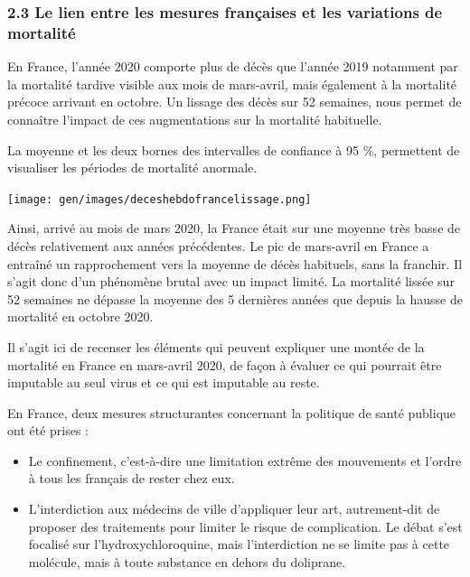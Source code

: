 \documentclass[
]{article}
\begin{document}
\hypertarget{le-lien-entre-les-mesures-franuxe7aises-et-les-variations-de-mortalituxe9}{%
\subsubsection{2.3 Le lien entre les mesures françaises et les
variations de
mortalité}\label{le-lien-entre-les-mesures-franuxe7aises-et-les-variations-de-mortalituxe9}}

En France, l'année 2020 comporte plus de décès que l'année 2019
notamment par la mortalité tardive visible aux mois de mars-avril, mais
également à la mortalité précoce arrivant en octobre. Un lissage des
décès sur 52 semaines, nous permet de connaître l'impact de ces
augmentations sur la mortalité habituelle.

La moyenne et les deux bornes des intervalles de confiance à 95 \%,
permettent de visualiser les périodes de mortalité anormale.

\texttt{[image: gen/images/deceshebdofrancelissage.png]}

Ainsi, arrivé au mois de mars 2020, la France était sur une moyenne très
basse de décès relativement aux années précédentes. Le pic de mars-avril
en France a entraîné un rapprochement vers la moyenne de décès
habituels, sans la franchir. Il s'agit donc d'un phénomène brutal avec
un impact limité. La mortalité lissée sur 52 semaines ne dépasse la
moyenne des 5 dernières années que depuis la hausse de mortalité en
octobre 2020.

Il s'agit ici de recenser les éléments qui peuvent expliquer une montée
de la mortalité en France en mars-avril 2020, de façon à évaluer ce qui
pourrait être imputable au seul virus et ce qui est imputable au reste.

En France, deux mesures structurantes concernant la politique de santé
publique ont été prises :

\begin{itemize}
\item
  Le confinement, c'est-à-dire une limitation extrême des mouvements et
  l'ordre à tous les français de rester chez eux.
\item
  L'interdiction aux médecins de ville d'appliquer leur art,
  autrement-dit de proposer des traitements pour limiter le risque de
  complication. Le débat s'est focalisé sur l'hydroxychloroquine, mais
  l'interdiction ne se limite pas à cette molécule, mais à toute
  substance en dehors du doliprane.
\end{itemize}
\end{document}
